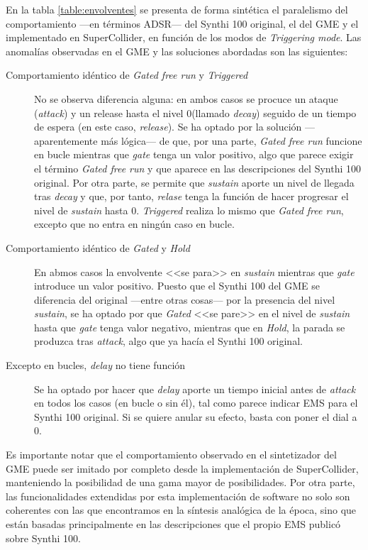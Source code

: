 En la tabla \ref{table:envolventes} se presenta de forma sintética el paralelismo del comportamiento ---en términos ADSR--- del Synthi 100 original, el del GME y el implementado en SuperCollider, en función de los modos de \textit{Triggering mode}. Las anomalías observadas en el GME y las soluciones abordadas son las siguientes:
\begin{description}
	\item[Comportamiento idéntico de \textit{Gated free run} y \textit{Triggered}] No se observa diferencia alguna: en ambos casos se procuce un ataque (\textit{attack}) y un release hasta el nivel 0(llamado \textit{decay}) seguido de un tiempo de espera (en este caso, \textit{release}). Se ha optado por la solución ---aparentemente más lógica--- de que, por una parte, \textit{Gated free run} funcione en bucle mientras que \textit{gate} tenga un valor positivo, algo que parece exigir el término \textit{Gated free run} y que aparece en las descripciones del Synthi 100 original. Por otra parte, se permite que \textit{sustain} aporte un nivel de llegada tras \textit{decay} y que, por tanto, \textit{relase} tenga la función de hacer progresar el nivel de \textit{sustain} hasta 0. \textit{Triggered} realiza lo mismo que \textit{Gated free run}, excepto que no entra en ningún caso en bucle.
	\item[Comportamiento idéntico de \textit{Gated} y \textit{Hold}] En abmos casos la envolvente <<se para>> en \textit{sustain} mientras que \textit{gate} introduce un valor positivo. Puesto que el Synthi 100 del GME se diferencia del original ---entre otras cosas--- por la presencia del nivel \textit{sustain}, se ha optado por que \textit{Gated} <<se pare>> en el nivel de \textit{sustain} hasta que \textit{gate} tenga valor negativo, mientras que en \textit{Hold}, la parada se produzca tras \textit{attack}, algo que ya hacía el Synthi 100 original.
	\item[Excepto en bucles, \textit{delay} no tiene función] Se ha optado por hacer que  \textit{delay}  aporte un tiempo inicial antes de \textit{attack} en todos los casos (en bucle o sin él), tal como parece indicar EMS para el Synthi 100 original. Si se quiere anular su efecto, basta con poner el dial a 0.
\end{description}

Es importante notar que el comportamiento observado en el sintetizador del GME puede ser imitado por completo desde la implementación de SuperCollider, manteniendo la posibilidad de una gama mayor de posibilidades. Por otra parte, las funcionalidades extendidas por esta implementación de software no solo son coherentes con las que encontramos en la síntesis analógica de la época, sino que están basadas principalmente en las descripciones que el propio EMS publicó sobre Synthi 100.



